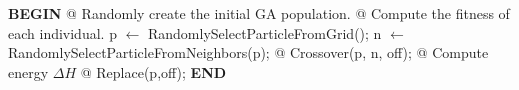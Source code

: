 \documentclass[runningheads,a4paper,11pt]{report}
\begin{document}

\begin{algorithm}
	\caption{SGA - Spin based Genetic AQlgorithm}
	\label{NGalg}
		\begin{algorithmic}


			\STATE \textbf{BEGIN}
  		\STATE @ Randomly create the initial GA population.
  		\STATE @ Compute the fitness of each individual.
  				\STATE p $\leftarrow$ RandomlySelectParticleFromGrid();
  				\STATE n $\leftarrow$ RandomlySelectParticleFromNeighbors(p);
  				\STATE @ Crossover(p, n, off);
  				\STATE @ Compute energy $\Delta H$
  					\STATE @ Replace(p,off);
  				\ENDIF
  			\ENDFOR
  		\ENDFOR
  		\STATE \textbf{END}
\end{algorithmic}
\end{algorithm}




\end{document}
